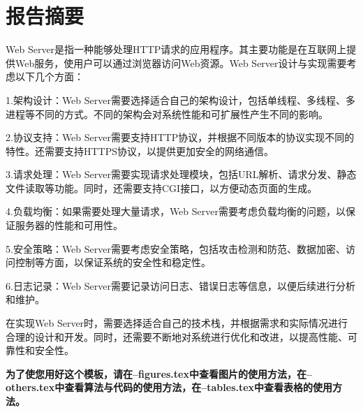 \chapter{报告摘要}
Web Server是指一种能够处理HTTP请求的应用程序。其主要功能是在互联网上提供Web服务，使用户可以通过浏览器访问Web资源。Web Server设计与实现需要考虑以下几个方面：

1.架构设计：Web Server需要选择适合自己的架构设计，包括单线程、多线程、多进程等不同的方式。不同的架构会对系统性能和可扩展性产生不同的影响。

2.协议支持：Web Server需要支持HTTP协议，并根据不同版本的协议实现不同的特性。还需要支持HTTPS协议，以提供更加安全的网络通信。

3.请求处理：Web Server需要实现请求处理模块，包括URL解析、请求分发、静态文件读取等功能。同时，还需要支持CGI接口，以方便动态页面的生成。

4.负载均衡：如果需要处理大量请求，Web Server需要考虑负载均衡的问题，以保证服务器的性能和可用性。

5.安全策略：Web Server需要考虑安全策略，包括攻击检测和防范、数据加密、访问控制等方面，以保证系统的安全性和稳定性。

6.日志记录：Web Server需要记录访问日志、错误日志等信息，以便后续进行分析和维护。

在实现Web Server时，需要选择适合自己的技术栈，并根据需求和实际情况进行合理的设计和开发。同时，还需要不断地对系统进行优化和改进，以提高性能、可靠性和安全性。

\textbf{为了使您用好这个模板，请在--figures.tex中查看图片的使用方法，在--others.tex中查看算法与代码的使用方法，在--tables.tex中查看表格的使用方法。}

